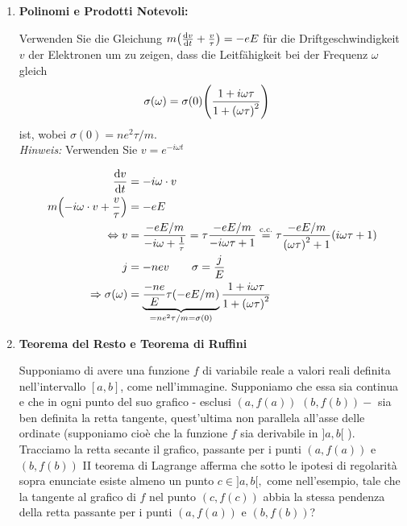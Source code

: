 \documentclass[10pt,a4paper]{exam}
\begin{document}
	\begin{enumerate}
    	\setcounter{enumi}{0}
        \item \textbf{Polinomi e Prodotti Notevoli:}
        \begin{mdframed}[style=exercise]
        Verwenden Sie die Gleichung $m\qty(\dv{v}{t}+\frac{v}{\tau})=-eE$ für die Driftgeschwindigkeit $v$ der Elektronen um zu zeigen, dass die Leitfähigkeit bei der Frequenz $\omega$ gleich
        \begin{align*}
			 \sigma (\omega) &= \sigma(0)\qty(\frac{1+i\omega\tau}{1+\qty(\omega\tau)^2})
		\end{align*}
        ist, wobei $\sigma (0)=ne^2\tau/m$.\\
        \textit{Hinweis:} Verwenden Sie $v=e^{-i\omega t}$
        \end{mdframed}
        \begin{align*}
			\dv{v}{t} &= -i\omega\cdot v\\
            m\qty(-i\omega\cdot v + \frac{v}{\tau}) &= -eE\\
            \Leftrightarrow v &= \frac{-eE/m}{-i\omega+\frac{1}{\tau}}=\tau\frac{-eE/m}{-i\omega\tau+1}\stackrel{\text{c.c.}}{=}\tau\frac{-eE/m}{\qty(\omega\tau)^2+1}\qty(i\omega\tau+1)\\
            j&=-nev\qquad\sigma=\frac{j}{E}\\
            \Rightarrow\sigma(\omega) &= \underbrace{\frac{-ne}{E}\tau\qty(-eE/m)}_{=ne^2\tau/m=\sigma (0)}\frac{1+i\omega\tau}{1+\qty(\omega\tau)^2}
		\end{align*}
        \item \textbf{Teorema del Resto e Teorema di Ruffini}
        \begin{mdframed}[style=exercise]
			Supponiamo di avere una funzione $f$ di variabile reale a valori reali definita nell'intervallo $[a, b]$, come nell'immagine. Supponiamo che essa sia continua e che in ogni punto del suo grafico - esclusi $(a, f(a))$ $(b, f(b))-$ sia ben definita la retta tangente, quest'ultima non parallela all'asse delle ordinate (supponiamo cioè che la funzione $f$ sia derivabile in $] a, b[$ ). Tracciamo la retta secante il grafico, passante per i punti $(a, f(a))$ e $(b, f(b))$
II teorema di Lagrange afferma che sotto le ipotesi di regolarità sopra enunciate esiste almeno un punto $c \in] a, b[,$ come nell'esempio, tale che la tangente al grafico di $f$ nel punto $(c, f(c))$ abbia la stessa pendenza della retta passante per i punti $(a, f(a))$ e $(b, f(b))$?
		\end{mdframed}

\end{enumerate}
\end{document}
